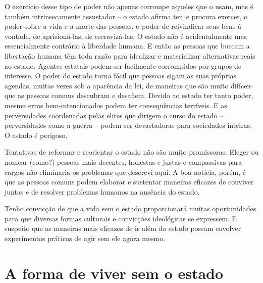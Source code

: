 O exercício desse tipo de poder não apenas corrompe aqueles que o usam, mas é também intrinsecamente assustador -- o estado afirma ter, e procura exercer, o poder sobre a vida e a morte das pessoas, o poder de reivindicar seus bens à vontade, de aprisioná-las, de escravizá-las. O estado não é acidentalmente mas essencialmente contrário à liberdade humana. E então as pessoas que buscam a libertação humana têm toda razão para idealizar e materializar alternativas reais ao estado. Agentes estatais podem ser facilmente corrompidos por grupos de interesse. O poder do estado torna fácil que pessoas sigam as suas próprias agendas, muitas vezes sob a aparência da lei, de maneiras que são muito difíceis que as pessoas comuns descubram e desafiem. Devido ao estado ter tanto poder, mesmo erros bem-intencionados podem ter consequências terríveis. E as perversidades coordenadas pelas elites que dirigem o curso do estado -- perversidades como a guerra -- podem ser devastadoras para sociedades inteiras. O estado é perigoso.

Tentativas de reformar e reorientar o estado não são muito promissoras. Eleger ou nomear (como?) pessoas mais decentes, honestas e justas e compassivas para cargos não eliminaria os problemas que descrevi aqui. A boa notícia, porém, é que as pessoas comuns podem elaborar e sustentar maneiras eficazes de conviver juntas e de resolver problemas humanos na ausência do estado.

Tenho convicção de que a vida sem o estado proporcionará muitas oportunidades para que diversas formas culturais e convicções ideológicas se expressem. E suspeito que as maneiras mais eficazes de ir além do estado possam envolver experimentos práticos de agir sem ele agora mesmo.

\section{A forma de viver sem o estado}


